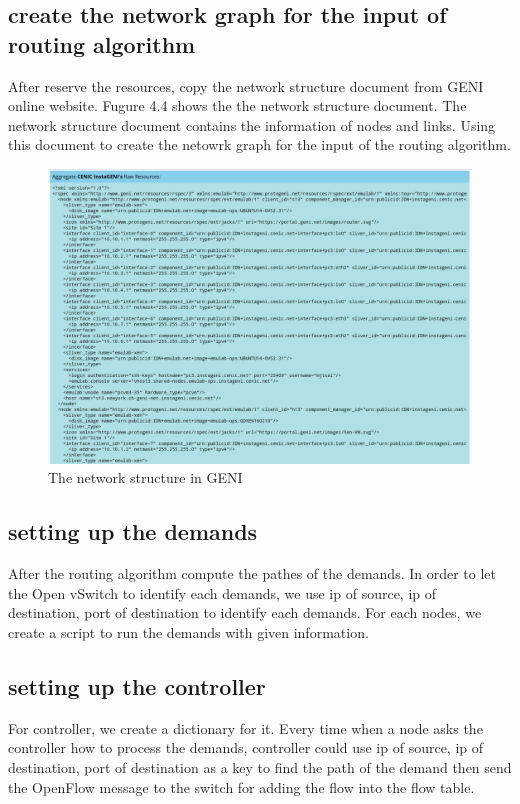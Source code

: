 \documentclass[a4paper,12pt]{report}
\begin{document}
\begin{large}
     \subsection{create the network graph for the input of routing algorithm}
     \qquad After reserve the resources, copy the network structure document from GENI online website. Fugure 4.4 shows the the network structure document. The network structure document contains the information of nodes and links. Using this document to create the netowrk graph for the input of the routing algorithm.
     \begin{figure}
        \caption{The network structure in GENI}
        \centering
          \includegraphics[width=1.0\textwidth]{Raw_resource.png}
     \end{figure}
     \subsection{setting up the demands}
     \qquad After the routing algorithm compute the pathes of the demands. In order to let the Open vSwitch to identify each demands, we use ip of source, ip of destination, port of destination to identify each demands.
 For each nodes, we create a script to run the demands with given information. 
 	\subsection{setting up the controller}
 	\qquad For controller, we create a dictionary for it. Every time when a node asks the controller how to process the demands, controller could use ip of source, ip of destination, port of destination as a key to find the path of the demand then send the OpenFlow message to the switch for adding the flow into the flow table. 

\end{large}
\end{document}
